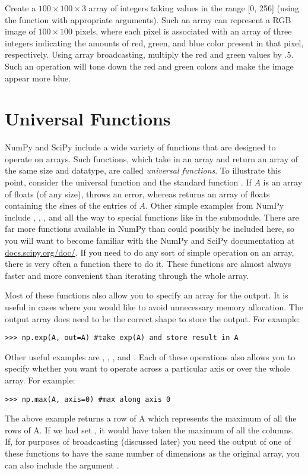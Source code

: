 \begin{problem}
Create a $100\times100\times3$ array of integers taking values in the range [0, 256] 
(using the function  with appropriate arguments).
Such an array can represent a RGB image of $100\times100$ pixels, where each pixel 
is associated with an array of three integers indicating the amounts of red, green, and blue color present in that pixel, respectively. 
Using array broadcasting, multiply the red and green values by $.5$. Such an operation will tone down the red and green colors 
and make the image appear more blue. 
\end{problem}

\section*{Universal Functions}
NumPy and SciPy include a wide variety of functions that are designed to operate on 
arrays.
Such functions, which take in an array and return an array of the same size and
datatype, are called \emph{universal functions}. To illustrate this point, consider 
the universal function  and the standard function . If $A$ 
is an array of floats (of any size),  throws an error, whereas 
 returns an array of floats containing the sines of the entries of $A$. 
Other simple examples from NumPy include , , , and 
 all the way to special functions like  in the  submodule.
There are far more functions available in NumPy than could possibly be included here, so you will want to become familiar with the NumPy and SciPy documentation at \url{docs.scipy.org/doc/}.
If you need to do any sort of simple operation on an array, there is very often a function there to do it.
These functions are almost always faster and more convenient than iterating through the whole array.

Most of these functions also allow you to specify an array for the output.
It is useful in cases where you would like to avoid unnecessary memory allocation.
The output array does need to be the correct shape to store the output.
For example:
\begin{lstlisting}
>>> np.exp(A, out=A) #take exp(A) and store result in A
\end{lstlisting}

Other useful examples are , , , and .
Each of these operations also allows you to specify whether you want to operate across a particular axis or over the whole array.
For example:
\begin{lstlisting}
>>> np.max(A, axis=0) #max along axis 0
\end{lstlisting}
The above example returns a row of A which represents the maximum of all the rows of A.
If we had set , it would have taken the maximum of all the columns.
If, for purposes of broadcasting (discussed later) you need the output of one of these functions to have the same number of dimensions as the original array, you can also include the argument .

